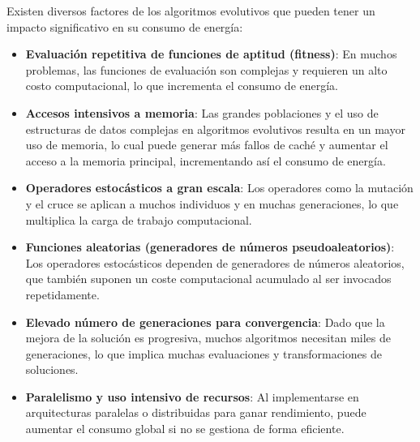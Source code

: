 Existen diversos factores de los algoritmos evolutivos que pueden tener un impacto significativo en su consumo de energía:

\begin{itemize}
    \item \textbf{Evaluación repetitiva de funciones de aptitud (fitness)}: En muchos problemas, las funciones de evaluación son complejas y requieren un alto costo computacional, lo que incrementa el consumo de energía.\cite{pillai2018genetic}
    \item \textbf{Accesos intensivos a memoria}: Las grandes poblaciones y el uso de estructuras de datos complejas en algoritmos evolutivos resulta en un mayor uso de memoria, lo cual puede generar más fallos de caché y aumentar el acceso a la memoria principal, incrementando así el consumo de energía.\cite{diaz2023multi}
    \item \textbf{Operadores estocásticos a gran escala}: Los operadores como la mutación y el cruce se aplican a muchos individuos y en muchas generaciones, lo que multiplica la carga de trabajo computacional. \cite{mendoza2017stochastic}
    \item \textbf{Funciones aleatorias (generadores de números pseudoaleatorios)}: Los operadores estocásticos dependen de generadores de números aleatorios, que también suponen un coste computacional acumulado al ser invocados repetidamente. \cite{jamil2022analyzing}
    \item \textbf{Elevado número de generaciones para convergencia}: Dado que la mejora de la solución es progresiva, muchos algoritmos necesitan miles de generaciones, lo que implica muchas evaluaciones y transformaciones de soluciones. \cite{diaz2021population}
    \item \textbf{Paralelismo y uso intensivo de recursos}: Al implementarse en arquitecturas paralelas o distribuidas para ganar rendimiento, puede aumentar el consumo global si no se gestiona de forma eficiente. \cite{medeiros2020distributed}
\end{itemize}
  


